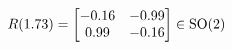 \documentclass[preview]{standalone}
\begin{document}
\begin{align*}
\special{dvisvgm:raw <g id='unique000'>}R(1.73) = \begin{bmatrix} -0.16 & -0.99 \\ 0.99 & -0.16 \end{bmatrix} \in \text{SO}(2)\special{dvisvgm:raw </g>}
\end{align*}
\end{document}
